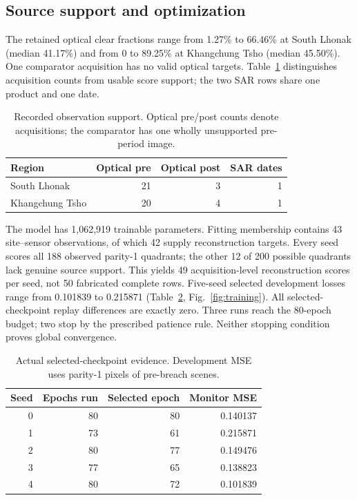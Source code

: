 \subsection{Source support and optimization}
The retained optical clear fractions range from 1.27\% to 66.46\% at South Lhonak (median 41.17\%) and from 0 to 89.25\% at Khangchung Tsho (median 45.50\%). One comparator acquisition has no valid optical targets. Table~\ref{tab:corpus} distinguishes acquisition counts from usable score support; the two SAR rows share one product and one date.

\begin{table}[t]\centering\small
\caption{Recorded observation support. Optical pre/post counts denote acquisitions; the comparator has one wholly unsupported pre-period image.}\label{tab:corpus}
\begin{tabular}{lrrr}\toprule
Region & Optical pre & Optical post & SAR dates\\\midrule
South Lhonak & 21 & 3 & 1\\
Khangchung Tsho & 20 & 4 & 1\\\bottomrule
\end{tabular}
\end{table}

The model has 1,062,919 trainable parameters. Fitting membership contains 43 site--sensor observations, of which 42 supply reconstruction targets. Every seed scores all 188 observed parity-1 quadrants; the other 12 of 200 possible quadrants lack genuine source support. This yields 49 acquisition-level reconstruction scores per seed, not 50 fabricated complete rows. Five-seed selected development losses range from 0.101839 to 0.215871 (Table~\ref{tab:seeds}, Fig.~\ref{fig:training}). All selected-checkpoint replay differences are exactly zero. Three runs reach the 80-epoch budget; two stop by the prescribed patience rule. Neither stopping condition proves global convergence.

\begin{table}[t]\centering\small
\caption{Actual selected-checkpoint evidence. Development MSE uses parity-1 pixels of pre-breach scenes.}\label{tab:seeds}
\begin{tabular}{rrrr}\toprule
Seed & Epochs run & Selected epoch & Monitor MSE\\\midrule
0 & 80 & 80 & 0.140137\\
1 & 73 & 61 & 0.215871\\
2 & 80 & 77 & 0.149476\\
3 & 77 & 65 & 0.138823\\
4 & 80 & 72 & 0.101839\\
\bottomrule\end{tabular}
\end{table}

